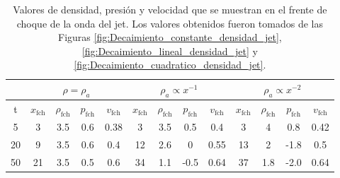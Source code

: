 \documentclass[12pt,a4paper]{book}
\begin{document}
\begin{table}[htbp]
  \begin{center}
  \begin{tabular}{|c|c|c|c|c|c|c|c|c|c|c|c|c|}
    \hline 
    & \multicolumn{4}{|c|}{$\rho = \rho_a$} & \multicolumn{4}{|c|}{$\rho_a \propto x^{-1}$} & \multicolumn{4}{|c|}{$\rho_a \propto x^{-2}$}\\
    \hline
    t & $x_{\text{fch}}$ & $\rho_{\text{fch}}$ & $p_{\text{fch}}$ & $v_{\text{fch}}$ & $x_{\text{fch}}$ & 
    $\rho_{\text{fch}}$ & $p_{\text{fch}}$ & $v_{\text{fch}}$ & $x_{\text{fch}}$ & $\rho_{\text{fch}}$ & $p_{\text{fch}}$ & 
    $v_{\text{fch}}$ \\
    \hline
     5 & 3  & 3.5 & 0.6 & 0.38    &  3  & 3.5 &  0.5  & 0.4     & 3  & 4   & 0.8  & 0.42 \\
    \hline
    20 & 9  & 3.5 & 0.6 & 0.4    &  12 & 2.6 &   0   & 0.55    & 13 & 2   & -1.8 & 0.5 \\
    \hline
    50 & 21 & 3.5 & 0.5 & 0.6    &  34 & 1.1 & -0.5  & 0.64     & 37 & 1.8 & -2.0 & 0.64 \\
    \hline

  \end{tabular}
  \caption{\label{Cuadro:valores_frente_choque} Valores de densidad, presión y velocidad que se muestran en el frente
  de choque de la onda del jet. Los valores obtenidos fueron tomados de las Figuras \ref{fig:Decaimiento_constante_densidad_jet},
  \ref{fig:Decaimiento_lineal_densidad_jet} y \ref{fig:Decaimiento_cuadratico_densidad_jet}.}
  \end{center}
  \end{table}
\end{document}
